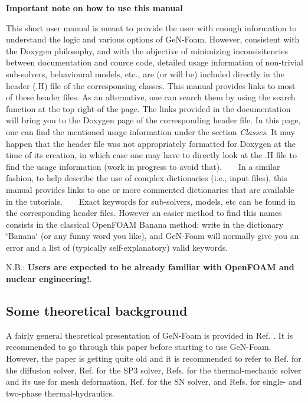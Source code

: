  {\bfseries Important note on how to use this manual}

This short user manual is meant to provide the user with enough information to understand the logic and various options of Ge\+N-\/\+Foam. However, consistent with the Doxygen philosophy, and with the objective of minimizing inconsisitencies between documentation and cource code, detailed usage information of non-\/trivial sub-\/solvers, behavioural models, etc., are (or will be) included directly in the header (.H) file of the corresponsing classes. This manual provides links to most of these header files. As an alternative, one can search them by using the search function at the top right of the page. The links provided in the documentation will bring you to the Doxygen page of the corresponding header file. In this page, one can find the mentioned usage information under the section {\itshape Classes}. It may happen that the header file was not appropriately formatted for Doxygen at the time of its creation, in which case one may have to directly look at the .H file to find the usage information (work in progress to avoid that). ~\newline
~\newline
 In a similar fashion, to help describe the use of complex dictionaries (i.\+e., input files), this manual provides links to one or more commented dictionaries that are available in the tutorials. ~\newline
~\newline
 Exact keywords for sub-\/solvers, models, etc can be found in the corresponding header files. However an easier method to find this names consists in the classical Open\+F\+O\+AM Banana method\+: write in the dictionary \char`\"{}\+Banana\char`\"{} (or any funny word you like), and Ge\+N-\/\+Foam will normally give you an error and a list of (typically self-\/explanatory) valid keywords. 

 N.\+B.\+: {\bfseries Users are expected to be already familiar with Open\+F\+O\+AM and nuclear engineering!}. 

\subsection*{Some theoretical background}

A fairly general theoretical presentation of Ge\+N-\/\+Foam is provided in Ref. \cite{FIORINA201524}. It is recommended to go through this paper before starting to use Ge\+N-\/\+Foam. However, the paper is getting quite old and it is recommended to refer to Ref. \cite{FIORINA2016212} for the diffusion solver, Ref. \cite{FIORINA2017419} for the S\+P3 solver, Refs. \cite{Fiorina2019DetailedOpenFoam} \cite{Fiorina2015ApplicationCodes} for the thermal-\/mechanic solver and its use for mesh deformation, Ref. \cite{Fiorina2019DetailedOpenFoam} for the SN solver, and Refs. \cite{Radman2019ADesign} \cite{RADMAN2021111178} \cite{RADMAN2021111422} for single-\/ and two-\/phase thermal-\/hydraulics.


